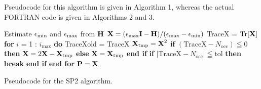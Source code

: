 Pseudocode for this algorithm is given in Algorithm 1, whereas the actual FORTRAN code is given in Algorithms 2 and 3.  

\begin{algorithm}[H]
  \algrenewcommand{}
  \begin{algorithmic}
    \parskip 0.05cm
    {\fontsize{0.3cm}{0.3em}\selectfont 
      \State Estimate $\epsilon_{\mathrm{min}}$ and $\epsilon_{\mathrm{max}}$ from $\textbf{H}$
      \State $\textbf{X} = (\epsilon_{\mathrm{max}} \textbf{I} - \textbf{H})/(\epsilon_{\mathrm{max}} - \epsilon_{\mathrm{min}}) $
      \State TraceX = $\mathrm{Tr}[\textbf{X}]$
      \State \textbf{for} $i$ = 1 : $i_{\mathrm{max}}$ \textbf{do}
      \State \qquad TraceXold = TraceX
      \State \qquad $\textbf{X}_{\mathrm{tmp}}=\textbf{X}^2$
      \State \qquad \textbf{if} $(\mathrm{TraceX} - N_{\mathrm{occ}}) \leqq 0$ \textbf{then}
      \State \qquad \qquad $\textbf{X} = 2\textbf{X} - \textbf{X}_{\mathrm{tmp}}$
      \State \qquad \textbf{else}
      \State \qquad \qquad $\textbf{X} = \textbf{X}_{\mathrm{tmp}}$
      \State \qquad \textbf{end if}
      \State \qquad \textbf{if} $|\mathrm{TraceX} - N_{\mathrm{occ}}| \leqq \mathrm{tol}$ \textbf{then}
      \State \qquad \qquad \textbf{break}
      \State \qquad \textbf{end if}
      \State \textbf{end for}
      \State $\textbf{P} = \textbf{X}$
      \EndFunction
    }       
  \end{algorithmic}
  \label{pcode}
  \caption{Pseudocode for the SP2 algorithm.}
\end{algorithm}

\newcommand{\myvarsf}[1]{\texttt{#1}}
\newcommand{\mynumf}[1]{\textit{#1}}
\newcommand{\eminb}[0]{\myvarsf{emin}}
\newcommand{\emaxb}[0]{\myvarsf{emax}}
\newcommand{\norb}[0]{\myvarsf{Norb}}
\newcommand{\noc}[0]{\myvarsf{Nocc}}
\newcommand{\hbml}[0]{\myvarsf{h\_bml}} 
\newcommand{\pbml}[0]{\myvarsf{rho\_bml}}
\newcommand{\type}[0]{\myvarsf{bml\_type}}
\newcommand{\lprec}[0]{\myvarsf{dp}}
\newcommand{\gb}[0]{\myvarsf{Gersh}}
\newcommand{\elem}[0]{\myvarsf{bml\_element\_real}}
\newcommand{\xx}[0]{\myvarsf{x2\_bml}}
\newcommand{\gf}[0]{\myvarsf{GershFact}}
\newcommand{\thr}[0]{\myvarsf{numthresh}}
\newcommand{\cvar}[0]{\myvarsf{Control\_vars}}
\newcommand{\trxb}[0]{\myvarsf{trx}}
\newcommand{\iter}[0]{\myvarsf{iter}}
\newcommand{\imax}[0]{\myvarsf{imax}}
\newcommand{\tol}[0]{\myvarsf{tol}}
\newcommand{\miter}[0]{\myvarsf{maxiter}}
%
\newcommand{\mone}[0]{\mynumf{-1.0\_dp}}
\newcommand{\one}[0]{\mynumf{1.0\_dp}}
\newcommand{\two}[0]{\mynumf{2.0\_dp}}
\newcommand{\zero}[0]{\mynumf{0.0\_dp}}

